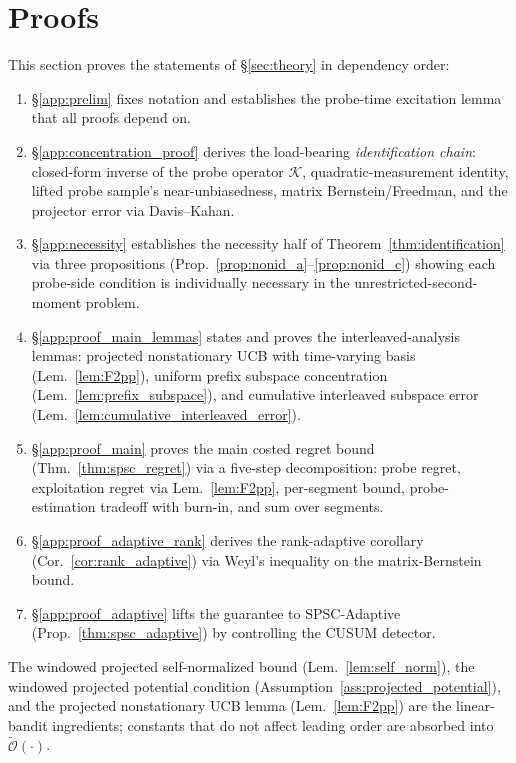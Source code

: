 \documentclass{article}
\newcommand{\tilO}{\widetilde{\mathcal{O}}}
\begin{document}
\section{Proofs}
\label{app:proofs}

This section proves the statements of \S\ref{sec:theory} in
dependency order:
\begin{enumerate}[leftmargin=*,itemsep=1pt,topsep=2pt]
  \item \S\ref{app:prelim} fixes notation and establishes the
    probe-time excitation lemma that all proofs depend on.
  \item \S\ref{app:concentration_proof} derives the load-bearing
    \emph{identification chain}: closed-form inverse of the probe
    operator $\mathcal K$, quadratic-measurement identity, lifted
    probe sample's near-unbiasedness, matrix Bernstein/Freedman, and
    the projector error via Davis--Kahan.
  \item \S\ref{app:necessity} establishes the necessity half of
    Theorem~\ref{thm:identification} via three propositions
    (Prop.~\ref{prop:nonid_a}--\ref{prop:nonid_c}) showing each
    probe-side condition is individually necessary in the
    unrestricted-second-moment problem.
  \item \S\ref{app:proof_main_lemmas} states and proves the
    interleaved-analysis lemmas: projected nonstationary UCB with
    time-varying basis (Lem.~\ref{lem:F2pp}), uniform prefix
    subspace concentration (Lem.~\ref{lem:prefix_subspace}), and
    cumulative interleaved subspace error
    (Lem.~\ref{lem:cumulative_interleaved_error}).
  \item \S\ref{app:proof_main} proves the main costed regret bound
    (Thm.~\ref{thm:spsc_regret}) via a five-step decomposition:
    probe regret, exploitation regret via Lem.~\ref{lem:F2pp},
    per-segment bound, probe-estimation tradeoff with burn-in, and
    sum over segments.
  \item \S\ref{app:proof_adaptive_rank} derives the rank-adaptive
    corollary (Cor.~\ref{cor:rank_adaptive}) via Weyl's inequality on
    the matrix-Bernstein bound.
  \item \S\ref{app:proof_adaptive} lifts the guarantee to
    SPSC-Adaptive (Prop.~\ref{thm:spsc_adaptive}) by controlling the
    CUSUM detector.
\end{enumerate}
The windowed projected self-normalized bound
(Lem.~\ref{lem:self_norm}), the windowed projected potential
condition (Assumption~\ref{ass:projected_potential}), and the
projected nonstationary UCB lemma (Lem.~\ref{lem:F2pp}) are the
linear-bandit ingredients; constants that do not affect leading
order are absorbed into $\tilO(\cdot)$.
\end{document}
